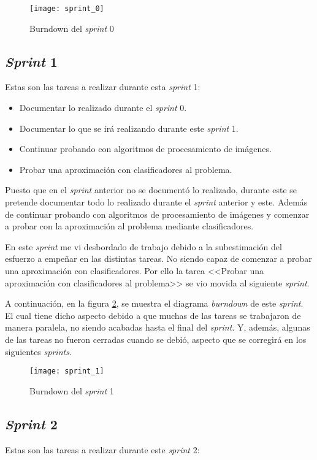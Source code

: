 \begin{figure}[h]
\centering
\texttt{[image: sprint\_0]}
\caption{Burndown del \textit{sprint} 0}
\label{fig:A.1.1}
\end{figure}

\subsection{\textit{Sprint} 1}
Estas son las tareas a realizar durante esta \textit{sprint} 1:

\begin{itemize}
	\item Documentar lo realizado durante el \textit{sprint} 0.
	\item Documentar lo que se irá realizando durante este \textit{sprint} 1.
	\item Continuar probando con algoritmos de procesamiento de imágenes.
	\item Probar una aproximación con clasificadores al problema.
\end{itemize}

Puesto que en el \textit{sprint} anterior no se documentó lo realizado, durante este se pretende documentar todo lo realizado durante el \textit{sprint} anterior y este. Además de continuar probando con algoritmos de procesamiento de imágenes y comenzar a probar con la aproximación al problema mediante clasificadores.

En este \textit{sprint} me vi desbordado de trabajo debido a la subestimación del esfuerzo a empeñar en las distintas tareas. No siendo capaz de comenzar a probar una aproximación con clasificadores. Por ello la tarea <<Probar una aproximación con clasificadores al problema>> se vio movida al siguiente \textit{sprint}. 

A continuación, en la figura \ref{fig:A.1.2}, se muestra el diagrama \textit{burndown} de este \textit{sprint}. El cual tiene dicho aspecto debido a que muchas de las tareas se trabajaron de manera paralela, no siendo acabadas hasta el final del \textit{sprint}. Y, además, algunas de las tareas no fueron cerradas cuando se debió, aspecto que se corregirá en los siguientes \textit{sprints}.

\begin{figure}[h]
\centering
\texttt{[image: sprint\_1]}
\caption{Burndown del \textit{sprint} 1}
\label{fig:A.1.2}
\end{figure}

\subsection{\textit{Sprint} 2}
Estas son las tareas a realizar durante este \textit{sprint} 2:


